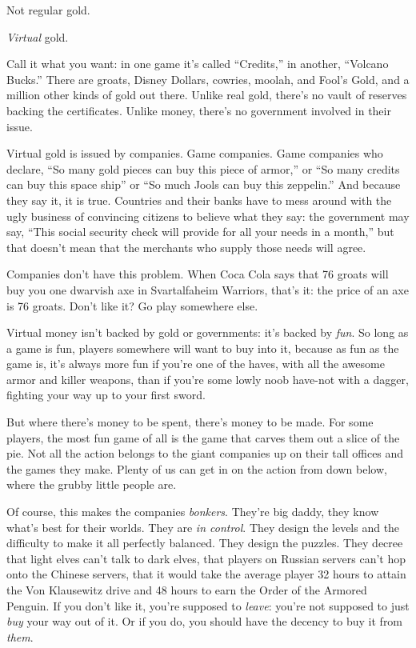 Not regular gold.

\emph{Virtual} gold.

Call it what you want: in one game it's called ``Credits,'' in
another, ``Volcano Bucks.'' There are groats, Disney Dollars,
cowries, moolah, and Fool's Gold, and a million other kinds of gold
out there. Unlike real gold, there's no vault of reserves backing
the certificates. Unlike money, there's no government involved in
their issue.

Virtual gold is issued by companies. Game companies. Game companies
who declare, ``So many gold pieces can buy this piece of armor,'' or
``So many credits can buy this space ship'' or ``So much Jools can buy
this zeppelin.'' And because they say it, it is true. Countries and
their banks have to mess around with the ugly business of
convincing citizens to believe what they say: the government may
say, ``This social security check will provide for all your needs in
a month,'' but that doesn't mean that the merchants who supply those
needs will agree.

Companies don't have this problem. When Coca Cola says that 76
groats will buy you one dwarvish axe in Svartalfaheim Warriors,
that's it: the price of an axe is 76 groats. Don't like it? Go play
somewhere else.

Virtual money isn't backed by gold or governments: it's backed by
\emph{fun}. So long as a game is fun, players somewhere will want
to buy into it, because as fun as the game is, it's always more fun
if you're one of the haves, with all the awesome armor and killer
weapons, than if you're some lowly noob have-not with a dagger,
fighting your way up to your first sword.

But where there's money to be spent, there's money to be made. For
some players, the most fun game of all is the game that carves them
out a slice of the pie. Not all the action belongs to the giant
companies up on their tall offices and the games they make. Plenty
of us can get in on the action from down below, where the grubby
little people are.

Of course, this makes the companies \emph{bonkers}. They're big
daddy, they know what's best for their worlds. They are
\emph{in control}. They design the levels and the difficulty to
make it all perfectly balanced. They design the puzzles. They
decree that light elves can't talk to dark elves, that players on
Russian servers can't hop onto the Chinese servers, that it would
take the average player 32 hours to attain the Von Klausewitz drive
and 48 hours to earn the Order of the Armored Penguin. If you don't
like it, you're supposed to \emph{leave}: you're not supposed to
just \emph{buy} your way out of it. Or if you do, you should have
the decency to buy it from \emph{them}.

